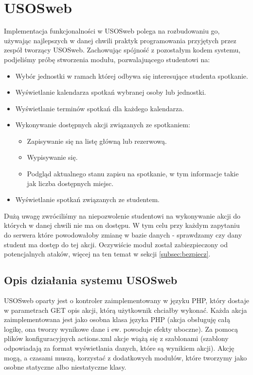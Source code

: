 \documentclass[licencjacka]{pracamgr}
\begin{document}
\section{USOSweb}\label{sec:impusosweb}
Implementacja funkcjonalności w USOSweb polega na rozbudowaniu go, używając najlepszych w danej chwili praktyk programowania przyjętych przez zespół tworzący USOSweb. Zachowując spójność z pozostałym kodem systemu, podjeliśmy próbę stworzenia modułu, pozwalajuącego studentowi na:
\begin{itemize}
\item{Wybór jednostki w ramach której odbywa się interesujące studenta spotkanie.}
\item{Wyświetlanie kalendarza spotkań wybranej osoby lub jednostki.}
\item{Wyświetlanie terminów spotkań dla każdego kalendarza.}
\item{Wykonywanie dostępnych akcji związanych ze spotkaniem:
\begin{itemize}
\item{Zapisywanie się na listę główną lub rezerwową.}
\item{Wypisywanie się.}
\item{Podgląd aktualnego stanu zapisu na spotkanie, w tym informacje takie jak liczba dostępnych miejsc.}
\end{itemize}
}
\item{Wyświetlanie spotkań związanych ze studentem.}
\end{itemize}

Dużą uwagę zwróciliśmy na niepozwolenie studentowi na wykonywanie akcji do których w danej chwili nie ma on dostępu. W tym celu przy każdym zapytaniu do serwera które powodowałoby zmianę w bazie danych - sprawdzamy czy dany student ma dostęp do tej akcji. Oczywiście moduł został zabiezpieczony od potencjalnych ataków, więcej na ten temat w sekcji \ref{subsec:bezpiecz}.
\subsection{Opis działania systemu USOSweb}
USOSweb oparty jest o kontroler zaimplementowany w języku PHP, który dostaje w parametrach GET opis akcji, którą użytkownik chciałby wykonać. Każda akcja zaimplementowana jest jako osobna klasa języka PHP (akcja obsługuję całą logikę, ona tworzy wynikowe dane i ew. powoduje efekty uboczne). Za pomocą plików konfiguracyjnych actions.xml akcje wiążą się z szablonami (szablony odpowiadają za format wyświetlania danych, które są wynikiem akcji). Akcję mogą, a czasami muszą, korzystać z dodatkowych modułów, które tworzymy jako osobne statyczne albo niestatyczne klasy.
\end{document}
